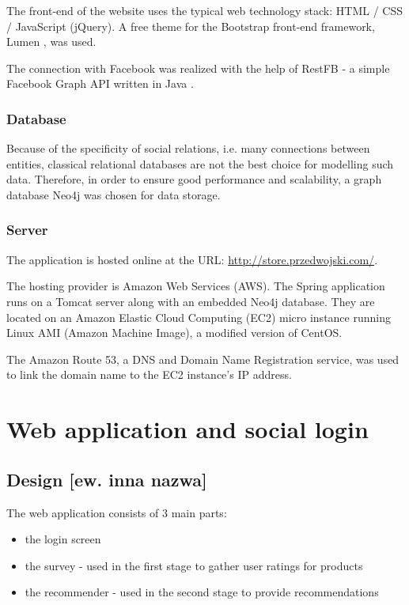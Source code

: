 \documentclass[12pt]{report}
\begin{document}
The front-end of the website uses the typical web technology stack: HTML / CSS / JavaScript (jQuery). A free theme for the Bootstrap front-end framework, Lumen \cite{lumen}, was used.

The connection with Facebook was realized with the help of RestFB - a simple Facebook Graph API written in Java \cite{restfb}.

\subsubsection{Database}

Because of the specificity of social relations, i.e. many connections between entities, classical relational databases are not the best choice for modelling such data. Therefore, in order to ensure good performance and scalability, a graph database Neo4j \cite{neo4j} was chosen for data storage.

\subsubsection{Server}

The application is hosted online at the URL: \url{http://store.przedwojski.com/}. 

The hosting provider is Amazon Web Services (AWS). The Spring application runs on a Tomcat server along with an embedded Neo4j database. They are located on an Amazon Elastic Cloud Computing (EC2) micro instance running Linux AMI (Amazon Machine Image), a modified version of CentOS.

The Amazon Route 53, a DNS and Domain Name Registration service, was used to link the domain name to the EC2 instance's IP address.

\section{Web application and social login}
\subsection{Design [ew. inna nazwa]}

The web application consists of 3 main parts:
\begin{itemize}
\item the login screen
\item the survey - used in the first stage to gather user ratings for products
\item the recommender - used in the second stage to provide recommendations
\end{itemize}
\end{document}
